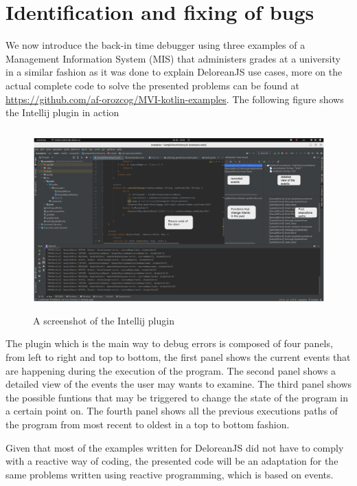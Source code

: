 
\chapter{Identification and fixing of bugs}
\label{cha:features}

We now introduce the back-in time debugger using three examples of a Management Information System (MIS) that administers grades at a university in a similar fashion as it was done to explain DeloreanJS use cases, more on the actual complete code to solve the presented problems can be found at \url{https://github.com/af-orozcog/MVI-kotlin-examples}. The following figure shows the Intellij plugin in action

\begin{figure}[h]
\centering
\includegraphics[height=7cm,width=13cm]{figures/Intellij}
\caption{A screenshot of the Intellij plugin}
\label{fig: A screenshot of the Intellij plugin}
\end{figure}

The plugin which is the main way to debug errors is composed of four panels, from left to right and top to bottom, the first panel shows the current events that are happening during the execution of the program. The second panel shows a detailed view of the events the user may wants to examine. The third panel shows the possible funtions that may be triggered to change the state of the program in a certain point on. The fourth panel shows all the previous executions paths of the program from most recent to oldest in a top to bottom fashion.

Given that most of the examples written for DeloreanJS did not have to comply with a reactive way of coding, the presented code will be an adaptation for the same problems written using reactive programming, which is based on events.

